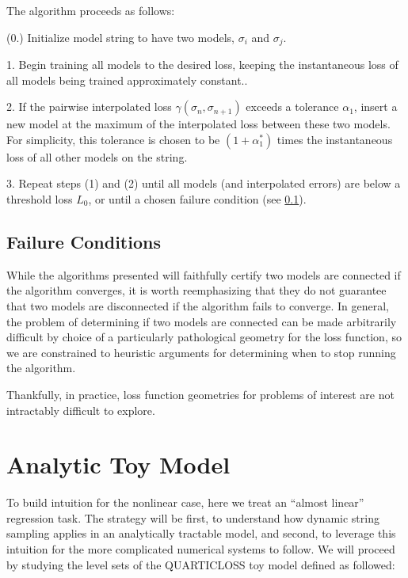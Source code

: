 \documentclass[twocolumn,superscriptaddress,aps,prb,floatfix]{revtex4-1}
\begin{document}
  The algorithm proceeds as follows:
  
  (0.) Initialize model string to have two models, $\sigma_i$ and $\sigma_j$.
  
  1. Begin training all models to the desired loss, keeping the instantaneous loss of all models being trained approximately constant..
  
  2. If the pairwise interpolated loss $\gamma(\sigma_n,\sigma_{n+1})$ exceeds a tolerance $\alpha_1$, insert a new model at the maximum of the interpolated loss between these two models.  For simplicity, this tolerance is chosen to be $(1 + \alpha_1^*)$ times the instantaneous loss of all other models on the string.  
  
  3. Repeat steps (1) and (2) until all models (and interpolated errors) are below a threshold loss $L_0$, or until a chosen failure condition (see \ref{sec:Fail}).
  
  \subsection{Failure Conditions}
  \label{sec:Fail}
  
  While the algorithms presented will faithfully certify two models are connected if the algorithm converges, it is worth reemphasizing that they do not guarantee that two models are disconnected if the algorithm fails to converge.  In general, the problem of determining if two models are connected can be made arbitrarily difficult by choice of a particularly pathological geometry for the loss function, so we are constrained to heuristic arguments for determining when to stop running the algorithm.
  
  Thankfully, in practice, loss function geometries for problems of interest are not intractably difficult to explore.
 

\section{Analytic Toy Model}
\label{sec:ToyModel}

 To build intuition for the nonlinear case, here we treat an ``almost linear'' regression task.  The strategy will be first, to understand how dynamic string sampling applies in an analytically tractable model, and second, to leverage this intuition for the more complicated numerical systems to follow.  We will proceed by studying the level sets of the \rm{QUARTICLOSS} toy model defined as followed:
 
\end{document}
